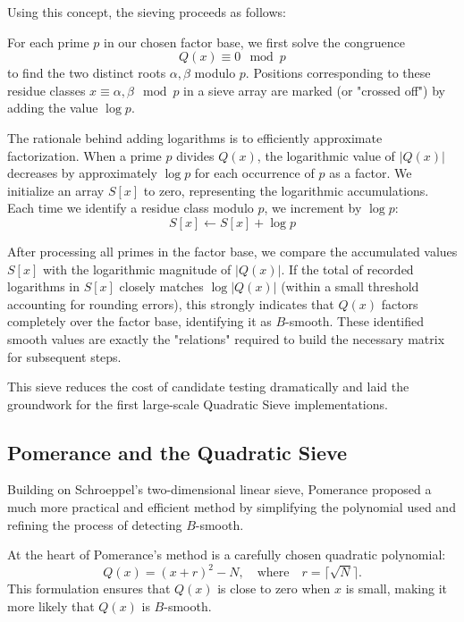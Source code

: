 \documentclass[a4paper, 11pt]{article}
\begin{document}
Using this concept, the sieving proceeds as follows:

For each prime $p$ in our chosen factor base, we first solve the congruence
\begin{equation}
Q(x) \equiv 0 \mod p
\end{equation}
to find the two distinct roots $\alpha, \beta$ modulo $p$. Positions corresponding to these residue classes $x \equiv \alpha, \beta \mod p$ in a sieve array are marked (or "crossed off") by adding the value $\log p$.

The rationale behind adding logarithms is to efficiently approximate factorization. When a prime $p$ divides $Q(x)$, the logarithmic value of $|Q(x)|$ decreases by approximately $\log p$ for each occurrence of $p$ as a factor. We initialize an array $S[x]$ to zero, representing the logarithmic accumulations. Each time we identify a residue class modulo $p$, we increment by $\log p$:
\begin{equation}
S[x] \leftarrow S[x] + \log p
\end{equation}

After processing all primes in the factor base, we compare the accumulated values $S[x]$ with the logarithmic magnitude of $|Q(x)|$. If the total of recorded logarithms in $S[x]$ closely matches $\log|Q(x)|$ (within a small threshold accounting for rounding errors), this strongly indicates that $Q(x)$ factors completely over the factor base, identifying it as $B$-smooth. These identified smooth values are exactly the "relations" required to build the necessary matrix for subsequent steps.

This sieve reduces the cost of candidate testing dramatically and laid the groundwork for the first large-scale Quadratic Sieve implementations.

\subsection{Pomerance and the Quadratic Sieve}

Building on Schroeppel's two-dimensional linear sieve, Pomerance proposed a much more practical and efficient method by simplifying the polynomial used and refining the process of detecting $B$-smooth.

At the heart of Pomerance's method is a carefully chosen quadratic polynomial:
\begin{equation}
Q(x) = (x + r)^2 - N, \quad \text{where} \quad r = \bigl\lceil\sqrt{N}\bigr\rceil.
\end{equation}
This formulation ensures that $Q(x)$ is close to zero when $x$ is small, making it more likely that $Q(x)$ is $B$-smooth.
\end{document}
